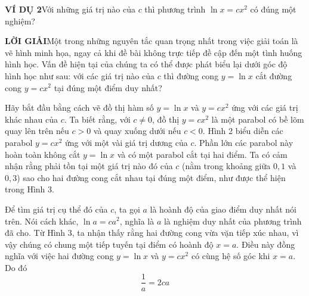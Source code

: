 \begin{minipage}[t]{380pt}
    \vspace{10pt}
    \noindent\textbf{\textsf{\color{stewartcyan}VÍ DỤ 2}}\quad Với những giá trị nào của $c$ thì phương trình $\ln x = cx^2$ có đúng một nghiệm?

    \vspace{6pt}
    \noindent\textbf{\textsf{\color{stewartcyan}LỜI GIẢI}}\quad Một trong những nguyên tắc quan trọng nhất trong việc giải toán là vẽ hình minh họa, ngay cả khi đề bài không trực tiếp đề cập đến một tình huống hình học. Vấn đề hiện tại của chúng ta có thể được phát biểu lại dưới góc độ hình học như sau: với các giá trị nào của $c$ thì đường cong $y = \ln x$ cắt đường cong $y = cx^2$ tại đúng một điểm duy nhất?

    Hãy bắt đầu bằng cách vẽ đồ thị hàm số $y = \ln x$ và $y = cx^2$ ứng với các giá trị khác nhau của $c$. Ta biết rằng, với $c \neq 0$, đồ thị $y = cx^2$ là một parabol có bề lõm quay lên trên nếu $c > 0$ và quay xuống dưới nếu $c < 0$. Hình 2 biểu diễn các parabol $y = cx^2$ ứng với một vài giá trị dương của $c$. Phần lớn các parabol này hoàn toàn không cắt $y = \ln x$ và có một parabol cắt tại hai điểm. Ta có cảm nhận rằng phải tồn tại một giá trị nào đó của $c$ (nằm trong khoảng giữa $0{,}1$ và $0{,}3$) sao cho hai đường cong cắt nhau tại đúng một điểm, như được thể hiện trong Hình 3.

    Để tìm giá trị cụ thể đó của $c$, ta gọi $a$ là hoành độ của giao điểm duy nhất nói trên. Nói cách khác, $\ln a = ca^2$, nghĩa là $a$ là nghiệm duy nhất của phương trình đã cho. Từ Hình 3, ta nhận thấy rằng hai đường cong vừa vặn tiếp xúc nhau, vì vậy chúng có chung một tiếp tuyến tại điểm có hoành độ $x = a$. Điều này đồng nghĩa với việc hai đường cong $y = \ln x$ và $y = cx^2$ có cùng hệ số góc khi $x = a$. Do đó
    \[
    \frac{1}{a} = 2ca
    \]
\end{minipage}
